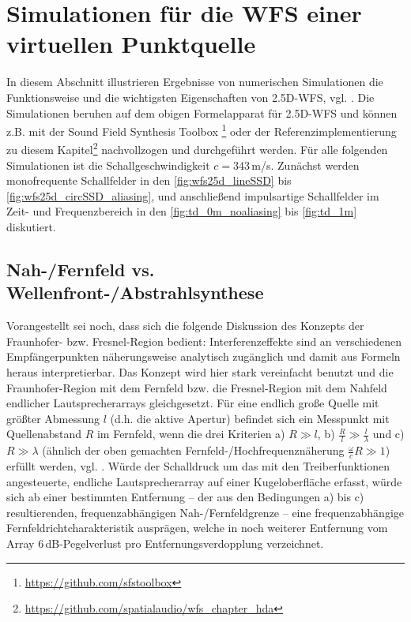 \section{Simulationen für die WFS einer virtuellen Punktquelle}
\label{sec:WFS_PointSource_Simulationen}
%
In diesem Abschnitt illustrieren Ergebnisse von numerischen Simulationen die
Funktionsweise und die wichtigsten Eigenschaften von 2.5D-WFS,
vgl. \cite{Berkhout1993_JASA,Boone1995_JAES,Start1997_diss,Spors2010a}.
%
Die Simulationen beruhen auf dem obigen Formelapparat für 2.5D-WFS
und können z.B. mit der Sound Field Synthesis
Toolbox \cite{Winter2019dagaposter}\footnote{\url{https://github.com/sfstoolbox}}
oder der Referenzimplementierung zu diesem
Kapitel\footnote{\url{https://github.com/spatialaudio/wfs_chapter_hda}}
nachvollzogen und durchgeführt werden.
%
Für alle folgenden Simulationen ist die Schallgeschwindigkeit $c=343$\,m/s.
%
Zunächst werden monofrequente Schallfelder in den
\Abb\ref{fig:wfs25d_lineSSD} bis \ref{fig:wfs25d_circSSD_aliasing},
und anschließend
impulsartige Schallfelder im Zeit- und Frequenzbereich
in den \Abb\ref{fig:td_0m_noaliasing} bis \ref{fig:td_1m}
diskutiert.



\subsection{Nah-/Fernfeld vs. Wellenfront-/Abstrahlsynthese}
%
Vorangestellt sei noch, dass sich die folgende Diskussion des Konzepts der Fraunhofer-
bzw. Fresnel-Region \cite[Kap.~26]{Skudrzyk1971} bedient: Interferenzeffekte
sind an verschiedenen Empfängerpunkten näherungsweise analytisch zugänglich und
damit aus Formeln heraus interpretierbar.
%
Das Konzept wird hier stark vereinfacht benutzt und die Fraunhofer-Region mit dem
Fernfeld bzw. die Fresnel-Region mit dem
Nahfeld endlicher Lautsprecherarrays gleichgesetzt.
%
Für eine endlich große Quelle mit größter Abmessung $l$ (d.h. die aktive Apertur)
befindet sich ein Messpunkt mit Quellenabstand $R$ im Fernfeld, wenn die
drei Kriterien
a) $R \gg l$,
b) $\frac{R}{l} \gg \frac{l}{\lambda}$ und
c) $R \gg \lambda$ (ähnlich der oben gemachten Fernfeld-/Hochfrequenznäherung
$\frac{\omega}{c} R \gg 1$) erfüllt werden, vgl. \cite[Kap.~3.5.4]{Moeser2015_book}.
%
Würde der Schalldruck um das mit den Treiberfunktionen angesteuerte,
endliche Lautsprecherarray auf einer Kugeloberfläche erfasst, würde sich ab einer
bestimmten Entfernung -- der aus den Bedingungen a) bis c) resultierenden,
frequenzabhängigen Nah-/Fernfeldgrenze -- eine
frequenzabhängige
Fernfeldrichtcharakteristik ausprägen, welche in
noch weiterer Entfernung vom Array
$6$\,dB-Pegelverlust pro Entfernungsverdopplung verzeichnet.



